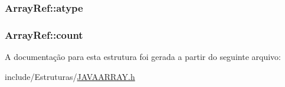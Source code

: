 \subsubsection[{atype}]{ Array\+Ref\+::atype}\label{struct_array_ref_a2fb58babe85ef3d37452e72c3c5c7513}
\hypertarget{struct_array_ref_abaaae2def8584a14b087e76d4308aec7}{}
\subsubsection[{count}]{ Array\+Ref\+::count}\label{struct_array_ref_abaaae2def8584a14b087e76d4308aec7}


A documentação para esta estrutura foi gerada a partir do seguinte arquivo\+:\begin{DoxyCompactItemize}
\item 
include/\+Estruturas/\hyperlink{_j_a_v_a_a_r_r_a_y_8h}{J\+A\+V\+A\+A\+R\+R\+A\+Y.\+h}\end{DoxyCompactItemize}
